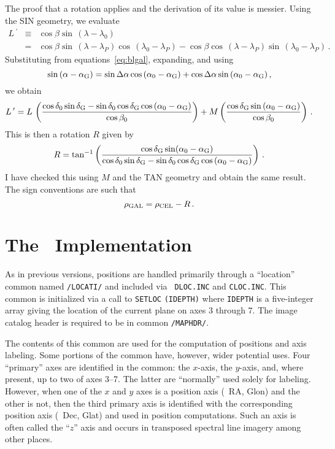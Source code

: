 The proof that a rotation applies and the derivation of its value
is messier.  Using the SIN geometry, we evaluate
\begin{eqnarray*}
  L\,^\prime & \equiv &\cos\beta\sin\,(\lambda-\lambda_0) \\
     & = &\cos\beta\sin\,(\lambda-\lambda_P)\cos\,(\lambda_0
     -\lambda_P) - \cos\beta\cos\,(\lambda-\lambda_P)\sin\,
     (\lambda_0-\lambda_P) \, .
\end{eqnarray*}
Substituting from equations~\ref{eq:blgal}, expanding, and using
\begin{displaymath}
  \sin\,(\alpha-\alpha_{\hbox{\scriptsize G}}) = \sin\Delta\alpha\cos\,(\alpha_0
     -\alpha_{\hbox{\scriptsize G}})+\cos\Delta\alpha\sin\,(\alpha_0-\alpha_{\hbox{\scriptsize G}}) \, ,
\end{displaymath}
we obtain
\begin{displaymath}
  L\,^\prime =L\,\left(\frac{\cos\delta_0\sin\delta_{\hbox{\scriptsize G}} -
     \sin\delta_0\cos\delta_{\hbox{\scriptsize G}}\cos\,(\alpha_0-\alpha_{\hbox{\scriptsize G}})}{\cos
     \beta_0} \right) + M \left( \frac{\cos\delta_{\hbox{\scriptsize G}}\sin\,
     (\alpha_0-\alpha_{\hbox{\scriptsize G}})}{\cos\beta_0} \right) \, .
\end{displaymath}
This is then a rotation $R$ given by
\begin{displaymath}
   R = \tan^{-1}\left( \frac{\cos\delta_{\hbox{\scriptsize G}}\sin(\alpha_0 -
       \alpha_{\hbox{\scriptsize G}})}{\cos\delta_0\sin\delta_{\hbox{\scriptsize G}}-\sin\delta_0\cos
       \delta_{\hbox{\scriptsize G}}\cos\,(\alpha_0-\alpha_{\hbox{\scriptsize G}})} \right) \, .
\end{displaymath}
I have checked this using $M$ and the TAN geometry and obtain the same
result. The sign conventions are such that
\begin{displaymath}
\rho_{{\hbox{\scriptsize GAL}}} = \rho_{{\hbox{\scriptsize CEL}}}-R \, .
\end{displaymath}

\section{The \AIPS\/\ Implementation}

As in previous versions, positions are handled primarily through a
``location'' common named {\tt /LOCATI/} and included via {\tt
DLOC.INC} and {\tt CLOC.INC}. This common is initialized via a call to
{\tt SETLOC} {\tt (IDEPTH)} where {\tt IDEPTH} is a five-integer array
giving the location of the current plane on axes 3 through 7.  The
image catalog header is required to be in common {\tt /MAPHDR/}.

The contents of this common are used for the computation of positions
and axis labeling.  Some portions of the common have, however, wider
potential uses.  Four ``primary'' axes are identified in the common:
the $x$-axis, the $y$-axis, and, where present, up to two of axes
3--7. The latter are ``normally'' used solely for labeling.  However,
when one of the $x$ and $y$ axes is a position axis (\eg\ RA,
Glon) and the other is not, then the third primary axis is identified
with the corresponding position axis (\eg\ Dec, Glat) and used
in position computations.  Such an axis is often called the ``$z$''
axis and occurs in transposed spectral line imagery among other
places.

